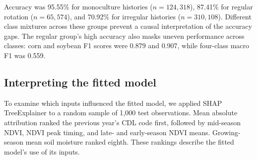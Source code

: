 Accuracy was 95.55\% for monoculture histories ($n=124{,}318$), 87.41\% for
regular rotation ($n=65{,}574$), and 70.92\% for irregular histories
($n=310{,}108$). Different class mixtures across these groups prevent a
causal interpretation of the accuracy gaps. The regular group's high accuracy
also masks uneven performance across classes: corn and soybean F1 scores were
0.879 and 0.907, while four-class macro F1 was 0.559.

\subsection{Interpreting the fitted model}

To examine which inputs influenced the fitted model, we applied SHAP
TreeExplainer \citep{lundberg2017shap} to a random sample of 1,000 test
observations. Mean absolute attribution ranked the previous
year's CDL code first, followed by mid-season NDVI, NDVI peak timing, and
late- and early-season NDVI means. Growing-season mean soil moisture ranked
eighth. These rankings describe the fitted model's use of its inputs.
